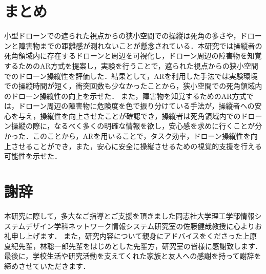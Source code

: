 \documentclass
[a4paper,11pt]{jreport}
\begin{document}
\chapter{まとめ}
小型ドローンでの遮られた視点からの狭小空間での操縦は死角の多さや，ドローンと障害物までの距離感が測れないことが懸念されている．本研究では操縦者の死角領域内に存在するドローンと周辺を可視化し，ドローン周辺の障害物を知覚するためのAR方式を提案し，実験を行うことで，遮られた視点からの狭小空間でのドローン操縦性を評価した．結果として，ARを利用した手法では実験環境での操縦時間が短く，衝突回数も少なかったことから，狭小空間での死角領域内のドローン操縦性の向上を示せた．
また，障害物を知覚するためのAR方式では，ドローン周辺の障害物に危険度を色で振り分けている手法が，操縦者への安心を与え，操縦性を向上させたことが確認でき，操縦者は死角領域内でのドローン操縦の際に，なるべく多くの明確な情報を欲し，安心感を求めに行くことが分かった．このことから，ARを用いることで，タスク効率，ドローン操縦性を向上させることができ，また，安心に安全に操縦させるための視覚的支援を行える可能性を示せた．





\chapter*{謝辞}
\thispagestyle{empty}
本研究に際して，多大なご指導とご支援を頂きました同志社大学理工学部情報システムデザイン学科ネットワーク情報システム研究室の佐藤健哉教授に心よりお礼申し上げます．
また，研究内容について親身にアドバイスをくださった上原夏紀先輩，林聡一郎先輩をはじめとした先輩方，研究室の皆様に感謝致します．
最後に，学校生活や研究活動を支えてくれた家族と友人への感謝を持って謝辞を締めさせていただきます．


\end{document}
